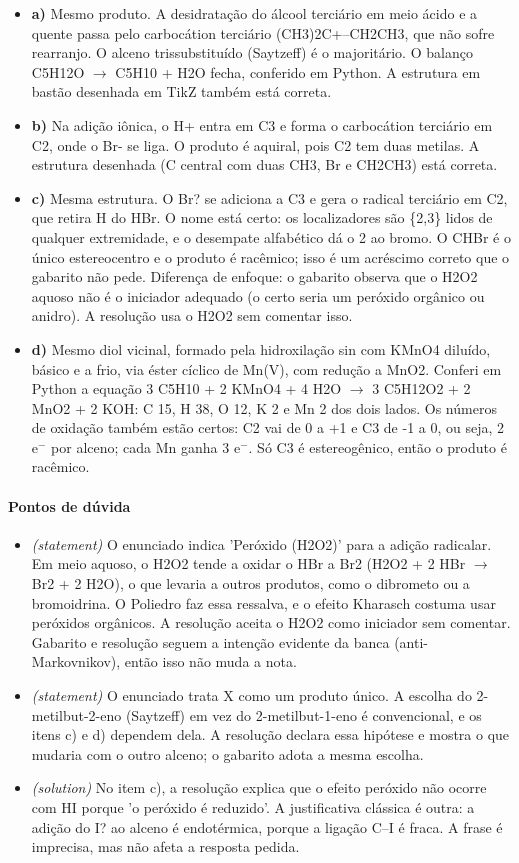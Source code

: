 \documentclass{article}%
\begin{document}
\begin{itemize}%
\item%
\textbf{a)} Mesmo produto. A desidratação do álcool terciário em meio ácido e a quente passa pelo carbocátion terciário (CH3)2C+--CH2CH3, que não sofre rearranjo. O alceno trissubstituído (Saytzeff) é o majoritário. O balanço C5H12O $\to$ C5H10 + H2O fecha, conferido em Python. A estrutura em bastão desenhada em TikZ também está correta.%
\item%
\textbf{b)} Na adição iônica, o H+ entra em C3 e forma o carbocátion terciário em C2, onde o Br- se liga. O produto é aquiral, pois C2 tem duas metilas. A estrutura desenhada (C central com duas CH3, Br e CH2CH3) está correta.%
\item%
\textbf{c)} Mesma estrutura. O Br? se adiciona a C3 e gera o radical terciário em C2, que retira H do HBr. O nome está certo: os localizadores são \{2,3\} lidos de qualquer extremidade, e o desempate alfabético dá o 2 ao bromo. O CHBr é o único estereocentro e o produto é racêmico; isso é um acréscimo correto que o gabarito não pede. Diferença de enfoque: o gabarito observa que o H2O2 aquoso não é o iniciador adequado (o certo seria um peróxido orgânico ou anidro). A resolução usa o H2O2 sem comentar isso.%
\item%
\textbf{d)} Mesmo diol vicinal, formado pela hidroxilação sin com KMnO4 diluído, básico e a frio, via éster cíclico de Mn(V), com redução a MnO2. Conferi em Python a equação 3 C5H10 + 2 KMnO4 + 4 H2O $\to$ 3 C5H12O2 + 2 MnO2 + 2 KOH: C 15, H 38, O 12, K 2 e Mn 2 dos dois lados. Os números de oxidação também estão certos: C2 vai de 0 a +1 e C3 de -1 a 0, ou seja, 2 e$^{-}$ por alceno; cada Mn ganha 3 e$^{-}$. Só C3 é estereogênico, então o produto é racêmico.%
\end{itemize}%
\paragraph{Pontos de dúvida}%
\begin{itemize}%
\item%
\textit{(statement)} O enunciado indica 'Peróxido (H2O2)' para a adição radicalar. Em meio aquoso, o H2O2 tende a oxidar o HBr a Br2 (H2O2 + 2 HBr $\to$ Br2 + 2 H2O), o que levaria a outros produtos, como o dibrometo ou a bromoidrina. O Poliedro faz essa ressalva, e o efeito Kharasch costuma usar peróxidos orgânicos. A resolução aceita o H2O2 como iniciador sem comentar. Gabarito e resolução seguem a intenção evidente da banca (anti{-}Markovnikov), então isso não muda a nota.%
\item%
\textit{(statement)} O enunciado trata X como um produto único. A escolha do 2{-}metilbut{-}2{-}eno (Saytzeff) em vez do 2{-}metilbut{-}1{-}eno é convencional, e os itens c) e d) dependem dela. A resolução declara essa hipótese e mostra o que mudaria com o outro alceno; o gabarito adota a mesma escolha.%
\item%
\textit{(solution)} No item c), a resolução explica que o efeito peróxido não ocorre com HI porque 'o peróxido é reduzido'. A justificativa clássica é outra: a adição do I? ao alceno é endotérmica, porque a ligação C--I é fraca. A frase é imprecisa, mas não afeta a resposta pedida.%
\end{itemize}%
\end{document}
